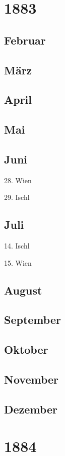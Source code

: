 \documentclass[twoside=false,titlepage=false,open=any, parskip=never, fontsize=10pt, headings=small, chapterprefix=false, appendixprefix=false, DIV=15]{scrbook}
\begin{document}
\begin{multicols}{3}
            \chapter*{1883}
            \section*{Februar}
            \section*{März}
            \section*{April}
            \section*{Mai}
            \section*{Juni}
            28. Wien\par
            29. Ischl\par
            \section*{Juli}
            14. Ischl\par
            15. Wien\par
            \section*{August}
            \section*{September}
            \section*{Oktober}
            \section*{November}
            \section*{Dezember}
            \chapter*{1884}

\end{multicols}
\end{document}
